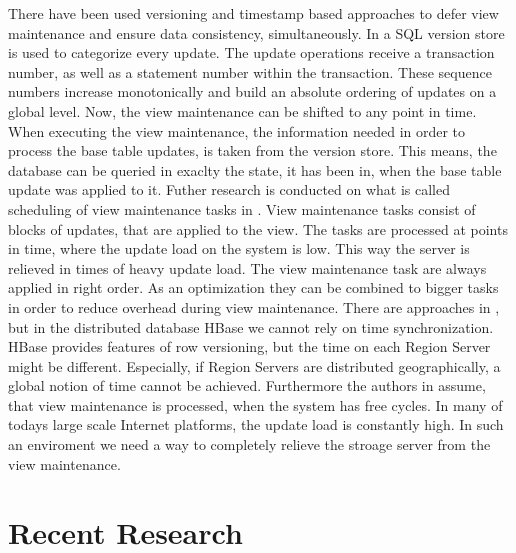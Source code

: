 \documentclass[11pt,a4paper,bibtotoc,idxtotoc,headsepline,footsepline,footexclude,BCOR12mm,DIV13]{scrbook}
\begin{document}
There have been used versioning and timestamp based approaches to defer view maintenance and ensure data consistency, simultaneously\cite{salem:how, zhou:lazy}. In \cite{zhou:lazy} a SQL version store is used to categorize every update. The update operations receive a transaction number, as well as a statement number within the transaction. These sequence numbers increase monotonically and build an absolute ordering of updates on a global level. Now, the view maintenance can be shifted to any point in time. When executing the view maintenance, the information needed in order to process the base table updates, is taken from the version store. This means, the database can be queried in exaclty the state, it has been in, when the base table update was applied to it. Futher research is conducted on what is called scheduling of view maintenance tasks in \cite{zhou:lazy}. View maintenance tasks consist of blocks of updates, that are applied to the view. The tasks are processed at points in time, where the update load on the system is low. This way the server is relieved in times of heavy update load. The view maintenance task are always applied in right order. As an optimization they can be combined to bigger tasks in order to reduce overhead during view maintenance. There are approaches in \cite{zhou:lazy}, but in the distributed database HBase we cannot rely on time synchronization. HBase provides features of row versioning, but the time on each Region Server might be different. Especially, if Region Servers are distributed geographically, a global notion of time cannot be achieved. Furthermore the authors in \cite{zhou:lazy} assume, that view maintenance is processed, when the system has free cycles. In many of todays large scale Internet platforms, the update load is constantly high. In such an enviroment we need a way to completely relieve the stroage server from the view maintenance.





\section{Recent Research}
\end{document}
